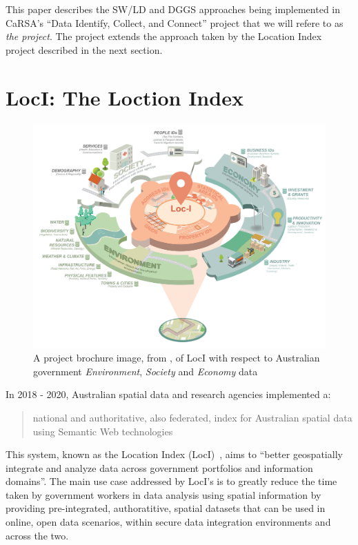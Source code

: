\documentclass[runningheads]{llncs}
\begin{document}
This paper describes the SW/LD and DGGS approaches being implemented in CaRSA's ``Data Identify, Collect, and Connect'' project that we will 
refere to as \textit{the project}. The project extends the approach taken by the Location Index project described in the next section.

\section{LocI: The Loction Index}\label{sec:loci}

\begin{figure}[htb]
    \centering
    \includegraphics[width=\linewidth]{images/loci-brochure.png}
    \caption{A project brochure image, from \cite{car_location_2019}, of LocI with respect to
    Australian government \textit{Environment}, \textit{Society} and \textit{Economy} data}
    \label{fig:geosparql11ontology}
\end{figure}

In 2018 - 2020, Australian spatial data and research agencies implemented a:

\begin{quotation}
    national and authoritative, also federated, index for Australian spatial data using Semantic Web technologies~\cite{car_location_2019}
\end{quotation}

This system, known as the Location Index (LocI)~\cite{car_location_2019}, aims to ``better geospatially integrate and analyze data across 
government portfolios and information domains''. The main use case addressed by LocI's is to greatly reduce the time taken by government 
workers in data analysis using spatial information by providing pre-integrated, authoratitive, spatial datasets that can be used in 
online, open data scenarios, within secure data integration environments and across the two.
\end{document}
